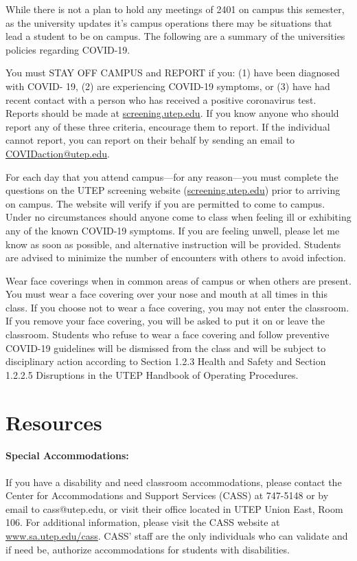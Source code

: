 \documentclass[12pt]{scrartcl}
\begin{document}
While there is not a plan to hold any meetings of 2401 on campus this semester, 
as the university updates it's campus operations there may be situations that lead a student to be on campus. 
The following are a summary of the universities policies regarding COVID-19.

You must STAY OFF CAMPUS and REPORT if you:
(1) have been diagnosed with COVID- 19, 
(2) are experiencing COVID-19 symptoms, or 
(3) have had recent contact with a person who has received a positive coronavirus test. 
Reports should be made at \url{screening.utep.edu}. 
If you know anyone who should report any of these three criteria, encourage them to report. 
If the individual cannot report, you can report on their behalf by sending an email to \url{COVIDaction@utep.edu}.

For each day that you attend campus—for any reason—you must complete the questions on the UTEP screening website (\url{screening.utep.edu}) prior to arriving on campus. 
The website will verify if you are permitted to come to campus. 
Under no circumstances should anyone come to class when feeling ill or exhibiting any of the known COVID-19 symptoms. 
If you are feeling unwell, please let me know as soon as possible, 
and alternative instruction will be provided. Students are advised to minimize the number of encounters with others to avoid infection.

Wear face coverings when in common areas of campus or when others are present. 
You must wear a face covering over your nose and mouth at all times in this class. 
If you choose not to wear a face covering, you may not enter the classroom. 
If you remove your face covering, you will be asked to put it on or leave the classroom. 
Students who refuse to wear a face covering and follow preventive COVID-19 guidelines will be dismissed from the class and will be subject to disciplinary action according to Section 1.2.3 Health and Safety and Section 1.2.2.5 Disruptions in the UTEP Handbook of Operating Procedures.


\section{Resources}

\paragraph{Special Accommodations: }
If you have a disability and need classroom accommodations, please contact the Center for Accommodations and Support Services (CASS) at 747-5148 or by email to cass@utep.edu, or visit their office located in UTEP Union East, Room 106. For additional information, please visit the CASS website at \url{www.sa.utep.edu/cass}. CASS’ staff are the only individuals who can validate and if need be, authorize accommodations for students with disabilities.
\end{document}
